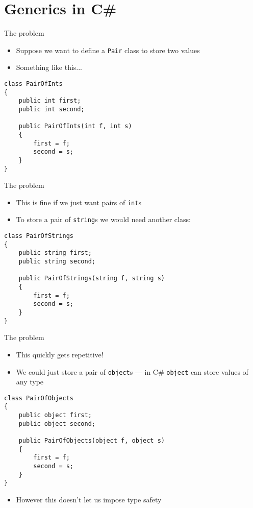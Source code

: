 \part{Generics in C\#}
\frame{\partpage}

\begin{frame}[fragile]{The problem}
    \begin{itemize}
        \pause\item Suppose we want to define a \lstinline{Pair} class to store two values
        \pause\item Something like this...
    \end{itemize}
    \pause
    \begin{lstlisting}
class PairOfInts
{
    public int first;
    public int second;
    
    public PairOfInts(int f, int s)
    {
        first = f;
        second = s;
    }
}
    \end{lstlisting}
\end{frame}

\begin{frame}[fragile]{The problem}
    \begin{itemize}
        \pause\item This is fine if we just want pairs of \lstinline{int}s
        \pause\item To store a pair of \lstinline{string}s we would need another class:
    \end{itemize}
    \pause
    \begin{lstlisting}
class PairOfStrings
{
    public string first;
    public string second;
    
    public PairOfStrings(string f, string s)
    {
        first = f;
        second = s;
    }
}
    \end{lstlisting}
\end{frame}

\begin{frame}[fragile]{The problem}
    \begin{itemize}
        \pause\item This quickly gets repetitive!
        \pause\item We could just store a pair of \lstinline{object}s --- in C\# \lstinline{object} can store values of any
            type
    \end{itemize}
    \pause
    \begin{lstlisting}
class PairOfObjects
{
    public object first;
    public object second;
    
    public PairOfObjects(object f, object s)
    {
        first = f;
        second = s;
    }
}
    \end{lstlisting}
    \begin{itemize}
        \pause\item However this doesn't let us impose type safety
    \end{itemize}
\end{frame}

